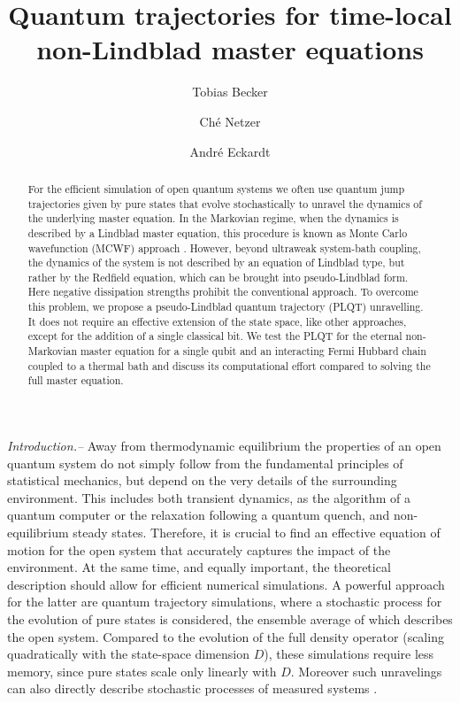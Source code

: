 \documentclass[twocolumn,prl,superscriptaddress]{revtex4-2}
\title@column\titleblock@produce
\makeatletter
\def\maketitle{
	\@author@finish
	\title@column\titleblock@produce
	\suppressfloats[t]}
\makeatother
\begin{document}
\title{Quantum trajectories for time-local non-Lindblad master equations}
\author{Tobias Becker}
\author{Ch\'{e} Netzer}
\author{Andr\'{e} Eckardt}



\begin{abstract}
For the efficient simulation of open quantum systems we often use quantum jump trajectories given by pure states that evolve stochastically to unravel the dynamics of the underlying master equation. In the Markovian regime, when the dynamics is described by a Lindblad master equation, this procedure is known as Monte Carlo wavefunction (MCWF) approach  \cite{Dalibard92,GardinerZoller1992:1}. However, beyond ultraweak system-bath coupling, the dynamics of the system is not described by an equation of Lindblad type, but rather by the Redfield equation, which can be brought into pseudo-Lindblad form. Here negative dissipation strengths prohibit the conventional approach. To overcome this problem, we propose a pseudo-Lindblad quantum trajectory (PLQT) unravelling. It does not require an effective extension of the state space, like other approaches, except for the addition of a single classical bit. We test the PLQT for the eternal non-Markovian master equation for a single qubit and an interacting Fermi Hubbard chain coupled to a thermal bath and discuss its computational effort compared to solving the full master equation. 
\end{abstract}

\maketitle
\emph{Introduction.--} Away from thermodynamic equilibrium the properties of an open quantum system do not simply follow from the fundamental principles of statistical mechanics, but depend on the very details of the surrounding environment. 
This includes both transient dynamics, as the algorithm of a quantum computer or the relaxation following a quantum quench, and non-equilibrium steady states. Therefore, it is crucial to find an effective equation of motion for the open system that accurately captures the impact of the environment. At the same time, and equally important, the theoretical description should allow for efficient numerical simulations. A powerful approach for the latter are quantum trajectory simulations, where a stochastic process for the evolution of pure states is considered, the ensemble average of which describes the open system. Compared to the evolution of the full density operator (scaling quadratically with the state-space dimension $D$), these simulations require less memory, since pure states scale only linearly with $D$. Moreover such unravelings can also directly describe stochastic processes of measured systems \cite{THBasche1995,SGleyzes2007,ZKMinev2019}. 
\end{document}
